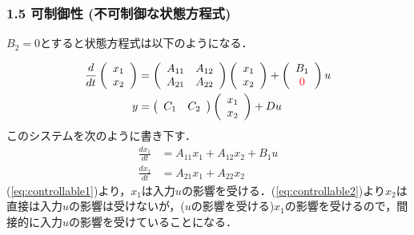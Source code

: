 \begin{frame}[t]
\frametitle{1.5 可制御性 (不可制御な状態方程式)}

$B_2=0$とすると状態方程式は以下のようになる．


\begin{align}
 \frac{d}{dt}
  \left(\begin{array}{c}
         {x}_1 \\
	 {x}_2
	\end{array}\right)
  &=
  \left(\begin{array}{cc}
         {A}_{11} & {A}_{12} \\
	     {A}_{21} & {A}_{22}
	\end{array}\right)
  \left(\begin{array}{c}
         {x}_1 \\
	 {x}_2
	\end{array}\right)
  +
  \left(\begin{array}{c}
         {B}_1 \\
	 \textcolor{red}{0}
	\end{array}\right)
  u \\
 y &=
  \left(\begin{array}{cc}
         {C}_1 & {C}_2
	\end{array}\right)
  \left(\begin{array}{c}
         {x}_1 \\
	 {x}_2
	\end{array}\right)
  + D u
\end{align}
このシステムを次のように書き下す．
\begin{align}
 \frac{dx_1}{dt} &= A_{11} x_1 + A_{12} x_2 + B_1 u
\label{eq:controllable1} \\
 \frac{dx_2}{dt} &= A_{21} x_1 + A_{22} x_2
\label{eq:controllable2}
\end{align}
(\ref{eq:controllable1})より，$x_1$は入力$u$の影響を受ける．(\ref{eq:controllable2})より$x_2$は直接は入力$u$の影響は受けないが，($u$の影響を受ける)$x_1$の影響を受けるので，間接的に入力$u$の影響を受けていることになる．
\end{frame}




